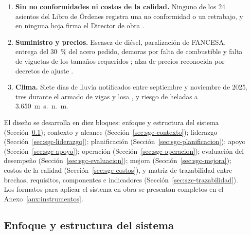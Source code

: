 \begin{enumerate}[label=\textbf{B\arabic*.},leftmargin=1.3cm]
  \item \textbf{Sin no conformidades ni costos de la calidad.} Ninguno de los 24 asientos del Libro de Órdenes registra una no conformidad o un retrabajo, y en ninguna hoja firma el Director de obra \parencite[pp.~114--125]{uatf2025pao2}.
  \item \textbf{Suministro y precios.} Escasez de diésel, paralización de FANCESA, entrega del 30~\% del acero pedido, demoras por falta de combustible y falta de viguetas de los tamaños requeridos \parencites{fancesa2025,laslomas2025}[pp.~11, 123]{uatf2025pao2}; alza de precios reconocida por decretos de ajuste \parencite{ds5321_2025,ds5597_2026}.
  \item \textbf{Clima.} Siete días de lluvia notificados entre septiembre y noviembre de 2025, tres durante el armado de vigas y losa \parencite[pp.~114--124]{uatf2025pao2}, y riesgo de heladas a 3.650~m~s.~n.~m.
\end{enumerate}

El diseño se desarrolla en diez bloques: enfoque y estructura del sistema (Sección~\ref{sec:sgc-enfoque}); contexto y alcance (Sección~\ref{sec:sgc-contexto}); liderazgo (Sección~\ref{sec:sgc-liderazgo}); planificación (Sección~\ref{sec:sgc-planificacion}); apoyo (Sección~\ref{sec:sgc-apoyo}); operación (Sección~\ref{sec:sgc-operacion}); evaluación del desempeño (Sección~\ref{sec:sgc-evaluacion}); mejora (Sección~\ref{sec:sgc-mejora}); costos de la calidad (Sección~\ref{sec:sgc-costos}), y matriz de trazabilidad entre brechas, requisitos, componentes e indicadores (Sección~\ref{sec:sgc-trazabilidad}). Los formatos para aplicar el sistema en obra se presentan completos en el Anexo~\ref{anx:instrumentos}.

\subsection{Enfoque y estructura del sistema}
\label{sec:sgc-enfoque}

